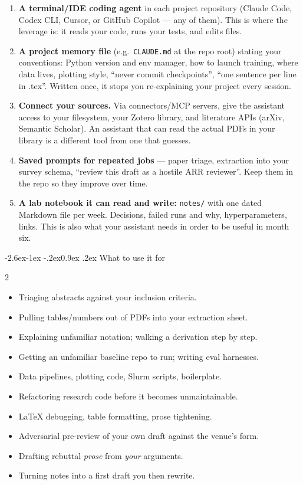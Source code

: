 \documentclass[11pt,a4paper]{article}
\makeatletter
\renewcommand\subsection{\@startsection{subsection}{2}{\z@}%
  {-2.6ex\@plus -1ex \@minus -.2ex}{0.9ex \@plus .2ex}%
  {\normalfont\large\bfseries\color{brandlight}}}
\newcommand{\code}[1]{\texttt{\small #1}}
\makeatother
\begin{document}
\begin{enumerate}
  \item \textbf{A terminal/IDE coding agent} in each project repository
        (Claude Code, Codex CLI, Cursor, or GitHub Copilot --- any of them).
        This is where the leverage
        is: it reads your code, runs your tests, and edits files.
  \item \textbf{A project memory file} (e.g.\ \code{CLAUDE.md} at the repo
        root) stating your conventions: Python version and env manager, how to
        launch training, where data lives, plotting style, ``never commit
        checkpoints'', ``one sentence per line in .tex''. Written once, it
        stops you re-explaining your project every session.
  \item \textbf{Connect your sources.} Via connectors/MCP servers, give the
        assistant access to your filesystem, your Zotero library, and
        literature APIs (arXiv, Semantic Scholar). An assistant that can read
        the actual PDFs in your library is a different tool from one that
        guesses.
  \item \textbf{Saved prompts for repeated jobs} --- paper triage, extraction
        into your survey schema, ``review this draft as a hostile ARR
        reviewer''. Keep them in the repo so they improve over time.
  \item \textbf{A lab notebook it can read and write:} \code{notes/} with one
        dated Markdown file per week. Decisions, failed runs and why,
        hyperparameters, links. This is also what your assistant needs in
        order to be useful in month six.
\end{enumerate}

\subsection{What to use it for}

\begin{multicols}{2}
\begin{itemize}
  \item Triaging abstracts against your inclusion criteria.
  \item Pulling tables/numbers out of PDFs into your extraction sheet.
  \item Explaining unfamiliar notation; walking a derivation step by step.
  \item Getting an unfamiliar baseline repo to run; writing eval harnesses.
  \item Data pipelines, plotting code, Slurm scripts, boilerplate.
  \item Refactoring research code before it becomes unmaintainable.
  \item LaTeX debugging, table formatting, prose tightening.
  \item Adversarial pre-review of your own draft against the venue's form.
  \item Drafting rebuttal \emph{prose} from \emph{your} arguments.
  \item Turning notes into a first draft you then rewrite.
\end{itemize}
\end{multicols}
\end{document}
